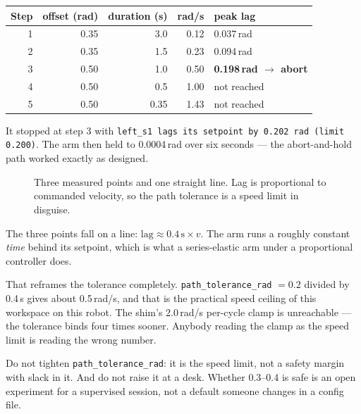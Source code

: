 \begin{table}[h]
\centering
\small
\begin{tabular}{@{}rrrrl@{}}
\toprule
\textbf{Step} & \textbf{offset (rad)} & \textbf{duration (s)} & \textbf{rad/s} & \textbf{peak lag} \\
\midrule
1 & 0.35 & 3.0  & 0.12 & 0.037\,rad \\
2 & 0.35 & 1.5  & 0.23 & 0.094\,rad \\
3 & 0.50 & 1.0  & 0.50 & \textbf{0.198\,rad $\rightarrow$ abort} \\
4 & 0.50 & 0.5  & 1.00 & not reached \\
5 & 0.50 & 0.35 & 1.43 & not reached \\
\bottomrule
\end{tabular}
\end{table}

It stopped at step 3 with \texttt{left\_s1 lags its setpoint by 0.202 rad (limit
0.200)}. The arm then held to 0.0004\,rad over six seconds --- the abort-and-hold
path worked exactly as designed.

\begin{figure}[h]
\centering

\caption{Three measured points and one straight line. Lag is proportional to
commanded velocity, so the path tolerance is a speed limit in disguise.}
\label{fig:lag}
\end{figure}

The three points fall on a line: $\mathrm{lag} \approx 0.4\,\mathrm{s} \times v$.
The arm runs a roughly constant \emph{time} behind its setpoint, which is what a
series-elastic arm under a proportional controller does.

That reframes the tolerance completely. \texttt{path\_tolerance\_rad} $= 0.2$
divided by 0.4\,s gives about 0.5\,rad/s, and that is the practical speed ceiling
of this workspace on this robot. The shim's 2.0\,rad/s per-cycle clamp is
unreachable --- the tolerance binds four times sooner. Anybody reading the clamp
as the speed limit is reading the wrong number.

\begin{notebox}
Do not tighten \texttt{path\_tolerance\_rad}: it is the speed limit, not a safety
margin with slack in it. And do not raise it at a desk. Whether 0.3--0.4 is safe
is an open experiment for a supervised session, not a default someone changes in
a config file.
\end{notebox}

